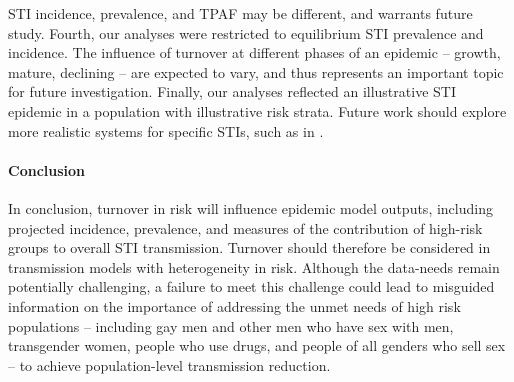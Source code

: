 STI incidence, prevalence, and TPAF may be different, and warrants future study.
Fourth, our analyses were restricted to
equilibrium STI prevalence and incidence.
The influence of turnover at different phases of an epidemic
-- growth, mature, declining --
are expected to vary, and thus represents an important topic for future investigation.
Finally, our analyses reflected an illustrative STI epidemic
in a population with illustrative risk strata.
Future work should explore more realistic systems for specific STIs,
such as in \citep{Johnson2016}.
\paragraph{Conclusion}
In conclusion, turnover in risk will influence
epidemic model outputs, including projected incidence, prevalence, and
measures of the contribution of high-risk groups to overall STI transmission.
Turnover should therefore be considered in
transmission models with heterogeneity in risk.
Although the data-needs remain potentially challenging,
a failure to meet this challenge
could lead to misguided information on the importance of
addressing the unmet needs of high risk populations -- including
gay men and other men who have sex with men,
transgender women,
people who use drugs, and
people of all genders who sell sex
-- to achieve population-level transmission reduction.
